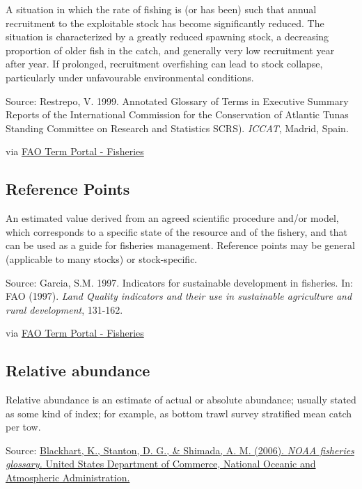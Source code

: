 \documentclass[
  11pt,
]{book}
\begin{document}
A situation in which the rate of fishing is (or has been) such that annual recruitment to the exploitable stock has become significantly reduced. The situation is characterized by a greatly reduced spawning stock, a decreasing proportion of older fish in the catch, and generally very low recruitment year after year. If prolonged, recruitment overfishing can lead to stock collapse, particularly under unfavourable environmental conditions.

Source: Restrepo, V. 1999. Annotated Glossary of Terms in Executive Summary Reports of the International Commission for the Conservation of Atlantic Tunas Standing Committee on Research and Statistics SCRS). \emph{ICCAT}, Madrid, Spain.

via \href{http://www.fao.org/fishery/glossary/en}{FAO Term Portal - Fisheries}

\hypertarget{reference-points}{%
\subsection{Reference Points}\label{reference-points}}

An estimated value derived from an agreed scientific procedure and/or model, which corresponds to a specific state of the resource and of the fishery, and that can be used as a guide for fisheries management. Reference points may be general (applicable to many stocks) or stock-specific.

Source: Garcia, S.M. 1997. Indicators for sustainable development in fisheries. In: FAO (1997). \emph{Land Quality indicators and their use in sustainable agriculture and rural development}, 131-162.

via \href{http://www.fao.org/fishery/glossary/en}{FAO Term Portal - Fisheries}

\hypertarget{relative-abundance}{%
\subsection{Relative abundance}\label{relative-abundance}}

Relative abundance is an estimate of actual or absolute abundance; usually stated as some kind of index; for example, as bottom trawl survey stratiﬁed mean catch per tow.

Source: \href{https://repository.library.noaa.gov/view/noaa/12856}{Blackhart, K., Stanton, D. G., \& Shimada, A. M. (2006). \emph{NOAA fisheries glossary.} United States Department of Commerce, National Oceanic and Atmospheric Administration.}
\end{document}
